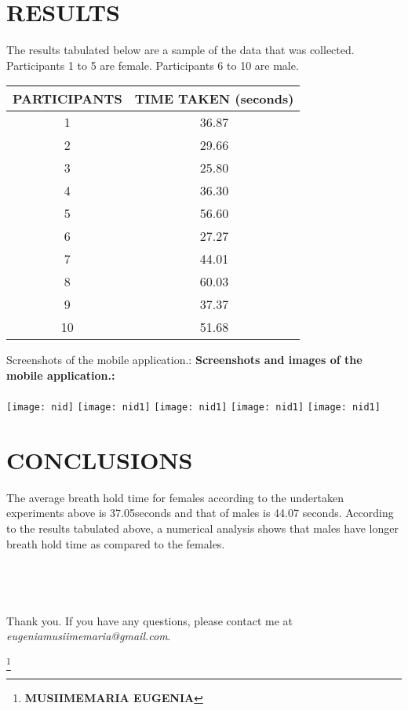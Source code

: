 \documentclass[12pt, letterpaper]{article}
\begin{document}
\clearpage
\section{\textbf{RESULTS} } 
The results tabulated below are a sample of the data that was collected. Participants 1 to 5 are female. Participants 6 to 10 are male.
\begin{table}[ht]
 
\begin{tabular}{|c | c | }

\hline                        
PARTICIPANTS  & TIME TAKEN  (seconds) \\ [0.5ex]
\hline
1 & 36.87 \\
2 & 29.66 \\
3 & 25.80 \\
4 & 36.30 \\
5 & 56.60 \\  
6 & 27.27 \\
7 & 44.01 \\
8 & 60.03 \\
9 & 37.37 \\
10 & 51.68 \\  [1ex]
\hline
\end{tabular}
\end{table}

Screenshots of the mobile application.:
\clearpage
\textbf{Screenshots and images of the mobile application.:}\\ \\ 
\texttt{[image: nid]}
\texttt{[image: nid1]}
\texttt{[image: nid1]}
\texttt{[image: nid1]}
\texttt{[image: nid1]}

\section{\textbf{CONCLUSIONS} } 
The average breath hold time for females according to the undertaken experiments above is 37.05seconds and that of males is 44.07 seconds. According to the results tabulated above, a numerical analysis shows that males have  longer breath hold time as compared to the females.\\ \\ \\ \\ \\



Thank you. If you have any questions, please contact me at \emph{eugeniamusiimemaria@gmail.com}.

\footnote{\textbf{ MUSIIMEMARIA EUGENIA}}
\end{document}

